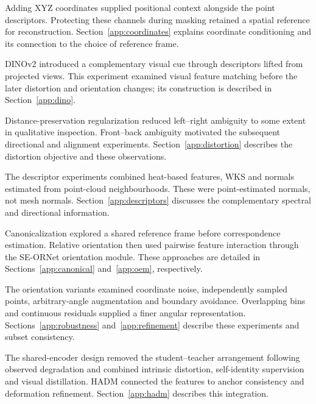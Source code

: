 Adding XYZ coordinates supplied positional context alongside the point descriptors. Protecting these channels during masking retained a spatial reference for reconstruction. Section~\ref{app:coordinates} explains coordinate conditioning and its connection to the choice of reference frame.

DINOv2 introduced a complementary visual cue through descriptors lifted from projected views. This experiment examined visual feature matching before the later distortion and orientation changes; its construction is described in Section~\ref{app:dino}.

Distance-preservation regularization reduced left--right ambiguity to some extent in qualitative inspection. Front--back ambiguity motivated the subsequent directional and alignment experiments. Section~\ref{app:distortion} describes the distortion objective and these observations.

The descriptor experiments combined heat-based features, WKS and normals estimated from point-cloud neighbourhoods. These were point-estimated normals, not mesh normals. Section~\ref{app:descriptors} discusses the complementary spectral and directional information.

Canonicalization explored a shared reference frame before correspondence estimation. Relative orientation then used pairwise feature interaction through the SE-ORNet orientation module. These approaches are detailed in Sections~\ref{app:canonical} and~\ref{app:oem}, respectively.

The orientation variants examined coordinate noise, independently sampled points, arbitrary-angle augmentation and boundary avoidance. Overlapping bins and continuous residuals supplied a finer angular representation. Sections~\ref{app:robustness} and~\ref{app:refinement} describe these experiments and subset consistency.

The shared-encoder design removed the student--teacher arrangement following observed degradation and combined intrinsic distortion, self-identity supervision and visual distillation. HADM connected the features to anchor consistency and deformation refinement. Section~\ref{app:hadm} describes this integration.

